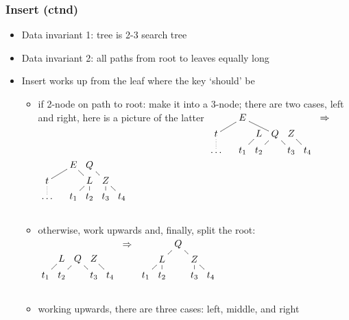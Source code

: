 \documentclass[handout]{beamer}
\begin{document}
\begin{frame}
    \frametitle{Insert (ctnd)}

\begin{itemize}[<+->]
\item Data invariant 1: tree is 2-3 search tree
\item Data invariant 2: all paths from root to leaves equally long
\item Insert works up from the  leaf where the key `should' be
\begin{itemize}[<+->]
 \item if 2-node on path to root: make it into a 3-node;  
 there are two cases, left and right, here is a picture of the latter
 $\xymatrix@R=.1cm@C=.1cm{
 &&\ar@{-}[dll]E\ar@{-}[rrd]&&&&&\Rightarrow\\
 t\ar@{.}[d]&&&L\ar@{-}[dl]&Q\ar@{-}[dl]\ar@{-}[rd]&Z\ar@{-}[rd]&\\
 \ldots&&t_1&t_2&&t_3&t_4\\}$
 $\xymatrix@R=.1cm@C=.1cm{
 &&\ar@{-}[dll]E\ar@{-}[rd]&Q\ar@{-}[dr]&&\\
 t\ar@{.}[d]&&&L\ar@{-}[dl]\ar@{-}[d]&Z\ar@{-}[d]\ar@{-}[rd]&\\
 \ldots&&t_1&t_2&t_3&t_4\\ \\}$
 
 \item otherwise, work upwards and, finally, split the root: 
 $\xymatrix@R=.1cm@C=.1cm{
&&&&&\Rightarrow\\
 &L\ar@{-}[dl]&Q\ar@{-}[dl]\ar@{-}[rd]&Z\ar@{-}[rd]&\\
 t_1&t_2&&t_3&t_4\\}$
 $\xymatrix@R=.1cm@C=.1cm{
 &&\ar@{-}[dl]Q\ar@{-}[rd]&&\\
 &\ar@{-}[d]L\ar@{-}[dl]&&Z\ar@{-}[d]\ar@{-}[rd]&&\\
 t_1&t_2&&t_3&t_4&\\ \\}$

\item working upwards, there are three cases: left, middle, and right
 \end{itemize}  
 
 \end{itemize}     
\end{frame}
\end{document}
